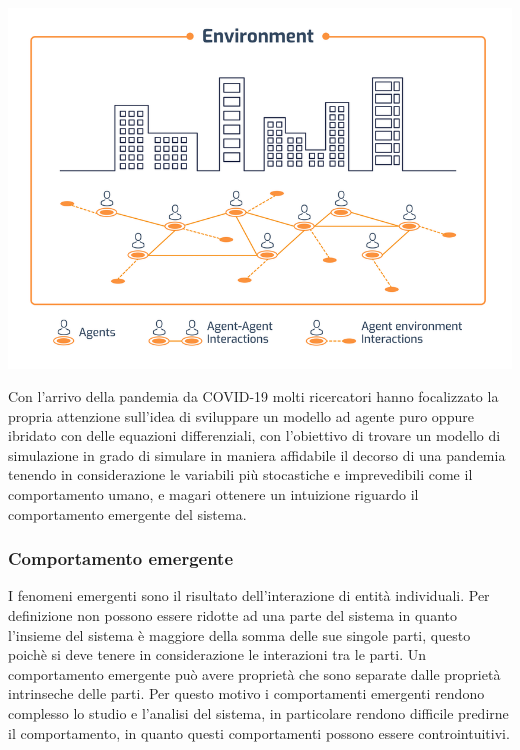 \begin{minipage}{\linewidth}
    \centering
    \includegraphics[scale=0.5]{img/Schematic-representation-of-an-agent-based-model-ABM.png}
    \label{fig:schematic_representation_abm}
\end{minipage}

Con l'arrivo della pandemia da COVID-19 molti ricercatori hanno 
focalizzato la propria attenzione sull'idea di sviluppare un modello 
ad agente puro oppure ibridato \cite{Marzban2021-pd} con delle equazioni
differenziali, con l'obiettivo di 
trovare un modello di simulazione in grado di simulare in maniera 
affidabile il decorso di una pandemia tenendo in considerazione le 
variabili più stocastiche e imprevedibili come il comportamento umano, e 
magari ottenere un intuizione riguardo il comportamento emergente del sistema.

\subsubsection*{Comportamento emergente}
I fenomeni emergenti sono il risultato dell'interazione di entità individuali. 
Per definizione non possono essere ridotte ad una parte del sistema in quanto 
l'insieme del sistema è maggiore della somma delle sue singole parti, questo poichè 
si deve tenere in considerazione le interazioni tra le parti. Un comportamento emergente 
può avere proprietà che sono separate dalle proprietà intrinseche delle parti.
Per questo motivo i comportamenti emergenti rendono complesso lo studio e l'analisi del
sistema, in particolare rendono difficile predirne il comportamento, in quanto questi comportamenti 
possono essere controintuitivi. 

